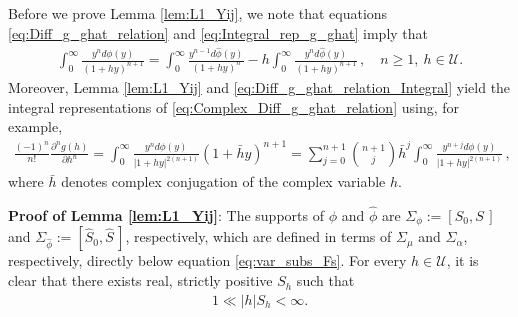 \documentclass[english,12pt,jmp,graphicx]{revtex4-1}
\newcommand{\ph}{\hat{\phi}}
\begin{document}
Before we prove Lemma \ref{lem:L1_Yij}, we note that equations
\eqref{eq:Diff_g_ghat_relation} and \eqref{eq:Integral_rep_g_ghat}
imply that
%
\begin{align}\label{eq:Diff_g_ghat_relation_Integral}
  \int_0^\infty \frac{y^nd\phi(y)}{(1+hy)^{n+1}}=\int_0^\infty\frac{y^{n-1}d\ph(y)}{(1+hy)^n} 
                                -h \int_0^\infty\frac{y^nd\ph(y)}{(1+hy)^{n+1}}
  \,, \quad   n\geq1, \ h\in\mathcal{U}.               
\end{align}
%
Moreover, Lemma \ref{lem:L1_Yij} and
\eqref{eq:Diff_g_ghat_relation_Integral} yield the integral
representations of \eqref{eq:Complex_Diff_g_ghat_relation} using, for
example, 
%
\begin{align}\label{eq:Complex_Diff_g}
  \frac{(-1)^n}{n!}\frac{\partial^ng(h)}{\partial h^n}
   =\int_0^\infty\frac{y^nd\phi(y)}{|1+hy|^{2(n+1)}}(1+\bar{h}y)^{n+1}
   =\sum_{j=0}^{n+1}{n+1 \choose j}\bar{h}^j
                 \int_0^\infty\frac{y^{n+j}d\phi(y)}{|1+hy|^{2(n+1)}}\,,               
\end{align}
%
where $\bar{h}$ denotes complex conjugation of the complex variable $h$.

\textbf{Proof of Lemma \ref{lem:L1_Yij}}:
%
The supports of $\phi$ and $\ph$ are $\Sigma_\phi:=[S_0,S\,]$ and
$\Sigma_{\ph}:=[\hat{S}_0,\hat{S}\,]$, respectively, which are defined in
terms of $\Sigma_\mu$ and $\Sigma_\alpha$, respectively, directly below equation
\eqref{eq:var_subs_Fs}. For every $h\in\mathcal{U}$, it is clear that
there exists real, strictly positive $S_h$ such that   
%
\begin{align}\label{eq:S1_asymp}
  1\ll|h|S_h<\infty.
\end{align}
%
\end{document}
